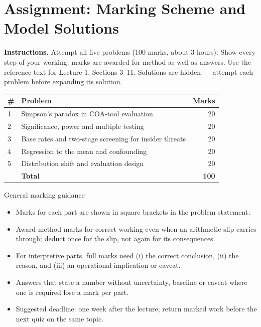 \documentclass[11pt]{article}
\begin{document}
\section{Assignment: Marking Scheme and Model Solutions}

\textbf{Instructions.} Attempt all five problems (100 marks, about 3 hours). Show every step of your working: marks are awarded for method as well as answers. Use the reference text for Lecture 1, Sections 3--11. Solutions are hidden --- attempt each problem before expanding its solution.

\begin{center}\small\renewcommand{\arraystretch}{1.25}\begin{tabularx}{0.85\textwidth}{@{}l X r@{}}\toprule\textbf{\#} & \textbf{Problem} & \textbf{Marks}\\\midrule1 & Simpson's paradox in COA-tool evaluation & 20\\
2 & Significance, power and multiple testing & 20\\
3 & Base rates and two-stage screening for insider threats & 20\\
4 & Regression to the mean and confounding & 20\\
5 & Distribution shift and evaluation design & 20\\\midrule & \textbf{Total} & \textbf{100}\\\bottomrule\end{tabularx}\end{center}

\begin{instr}{General marking guidance}\begin{itemize}
\item Marks for each part are shown in square brackets in the problem statement.
\item Award method marks for correct working even when an arithmetic slip carries through; deduct once for the slip, not again for its consequences.
\item For interpretive parts, full marks need (i) the correct conclusion, (ii) the reason, and (iii) an operational implication or caveat.
\item Answers that state a number without uncertainty, baseline or caveat where one is required lose a mark per part.
\item Suggested deadline: one week after the lecture; return marked work before the next quiz on the same topic.
\end{itemize}\end{instr}
\end{document}
